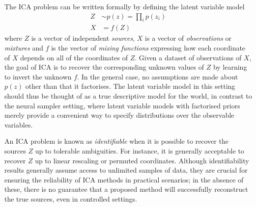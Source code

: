 The ICA problem can be written formally by defining the 
latent variable model
%
\begin{align}
Z &\sim p(z) = \prod_i p(z_i) \label{eqn:ica-basic-1} \\
X &= f(Z) \label{eqn:ica-basic-2}
\end{align}
%
where $Z$ is a vector of independent \emph{sources}, $X$ is a vector of \emph{observations} or \emph{mixtures} and $f$ is the vector of \emph{mixing functions} expressing how each coordinate of $X$ depends on all of the coordinates of $Z$. 
Given a dataset of observations of $X$, the goal of ICA is to recover the corresponding unknown values of $Z$ by learning to invert the unknown $f$.
In the general case, no assumptions are made about $p(z)$ other than that it factorises.
The latent variable model in this setting should thus be thought of as a true descriptive model for the world, 
in contrast to the neural sampler setting, where latent variable models with factorised priors merely provide a convenient way to specify distributions over the observable variables. 



An ICA problem is known as \emph{identifiable} when it is possible to recover the sources $Z$ up to tolerable ambiguities. 
For instance, it is generally acceptable to recover $Z$ up to linear rescaling or permuted coordinates.
Although identifiability results generally assume access to unlimited samples of data, they are crucial for ensuring the reliability of ICA methods in practical scenarios; in the absence of these, there is no guarantee that a proposed method will successfully reconstruct the true sources, even in controlled settings.

